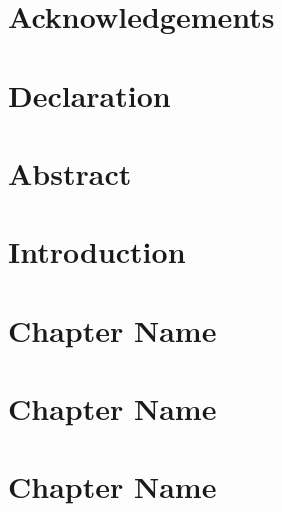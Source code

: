 \documentclass[12pt]{report}
\theoremstyle{definition}
\begin{document}
\chapter*{Acknowledgements}





\clearpage
\chapter*{Declaration}




\clearpage
\chapter*{Abstract}



\clearpage

\tableofcontents

\chapter{Introduction}





\chapter{Chapter Name}





\appendix

\chapter{Chapter Name}


\chapter{Chapter Name}


\printbibliography


 
\end{document}
